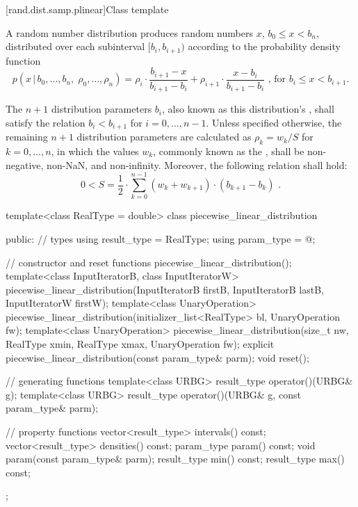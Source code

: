 [rand.dist.samp.plinear]{Class template }%
%
%

\pnum
A  random number distribution
produces random numbers $x$,
$b_0 \leq x < b_n$,
distributed over each subinterval
$[b_i, b_{i+1})$
according to the probability density function
%
%
\[ p(x \,|\, b_0, \dotsc, b_n, \; \rho_0, \dotsc, \rho_n)
     = \rho_{i}   \cdot {\frac{b_{i+1} - x}{b_{i+1} - b_i}}
     + \rho_{i+1} \cdot {\frac{x - b_i}{b_{i+1} - b_i}}
     \text{ , for $b_i \le x < b_{i+1}$.} \]

\pnum
The $n + 1$ distribution parameters $b_i$,
also known as this distribution's %
%
%
, shall satisfy the relation $b_i < b_{i+1}$ for $i = 0, \dotsc, n - 1$.
Unless specified otherwise,
the remaining $n + 1$ distribution parameters are calculated as
$\rho_k = {w_k / S}$ for $k = 0, \dotsc, n$, in which the values $w_k$,
commonly known as the %
%
%
, shall be non-negative, non-NaN, and non-infinity.
Moreover, the following relation shall hold:
\[ 0 < S = \frac{1}{2} \cdot \sum_{k=0}^{n-1} (w_k + w_{k+1}) \cdot (b_{k+1} - b_k) \text{ .} \]

%
\begin{codeblock}
template<class RealType = double>
  class piecewise_linear_distribution {
  public:
    // types
    using result_type = RealType;
    using param_type  = @\unspec@;

    // constructor and reset functions
    piecewise_linear_distribution();
    template<class InputIteratorB, class InputIteratorW>
      piecewise_linear_distribution(InputIteratorB firstB, InputIteratorB lastB,
                                    InputIteratorW firstW);
    template<class UnaryOperation>
      piecewise_linear_distribution(initializer_list<RealType> bl, UnaryOperation fw);
    template<class UnaryOperation>
      piecewise_linear_distribution(size_t nw, RealType xmin, RealType xmax, UnaryOperation fw);
    explicit piecewise_linear_distribution(const param_type& parm);
    void reset();

    // generating functions
    template<class URBG>
      result_type operator()(URBG& g);
    template<class URBG>
      result_type operator()(URBG& g, const param_type& parm);

    // property functions
    vector<result_type> intervals() const;
    vector<result_type> densities() const;
    param_type param() const;
    void param(const param_type& parm);
    result_type min() const;
    result_type max() const;
  };
\end{codeblock}

